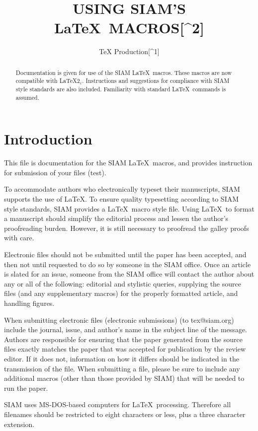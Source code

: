 \documentclass[]{article}
\title{USING SIAM'S LaTeX~MACROS{[}\^{}2{]}}
\author{TeX Production{[}\^{}1{]}}
\date{}
\begin{document}
\maketitle
\begin{abstract}
Documentation is given for use of the SIAM LaTeX~macros. These macros
are now compatible with LaTeX\(2_{\varepsilon}\). Instructions and
suggestions for compliance with SIAM style standards are also included.
Familiarity with standard LaTeX~commands is assumed.
\end{abstract}

\section{Introduction}\label{introduction}

This file is documentation for the SIAM LaTeX~macros, and provides
instruction for submission of your files (test).

To accommodate authors who electronically typeset their manuscripts,
SIAM supports the use of LaTeX. To ensure quality typesetting according
to SIAM style standards, SIAM provides a LaTeX~macro style file. Using
LaTeX~to format a manuscript should simplify the editorial process and
lessen the author's proofreading burden. However, it is still necessary
to proofread the galley proofs with care.

Electronic files should not be submitted until the paper has been
accepted, and then not until requested to do so by someone in the SIAM
office. Once an article is slated for an issue, someone from the SIAM
office will contact the author about any or all of the following:
editorial and stylistic queries, supplying the source files (and any
supplementary macros) for the properly formatted article, and handling
figures.

When submitting electronic files (electronic submissions) (to
{tex@siam.org}) include the journal, issue, and author's name in the
subject line of the message. Authors are responsible for ensuring that
the paper generated from the source files exactly matches the paper that
was accepted for publication by the review editor. If it does not,
information on how it differs should be indicated in the transmission of
the file. When submitting a file, please be sure to include any
additional macros (other than those provided by SIAM) that will be
needed to run the paper.

SIAM uses MS-DOS-based computers for LaTeX~processing. Therefore all
filenames should be restricted to eight characters or less, plus a three
character extension.
\end{document}
